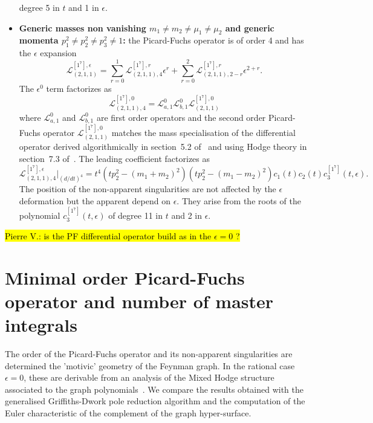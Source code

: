 \documentclass[a4paper,12pt]{article}
\numberwithin{equation}{section}
\numberwithin{figure}{subsection}
\theoremstyle{plain}
\theoremstyle{plain}
\theoremstyle{definition}
\theoremstyle{plain}
\theoremstyle{remark}
\theoremstyle{plain}
\newcommand{\pvnote}[1]{\sethlcolor{bubblegum} \protect\hl{Pierre V.: #1} \sethlcolor{yellow}}
\begin{document}
\begin{itemize}
                 degree 5 in $t$ and 1 in $\epsilon$.
  \item \textbf{Generic masses non vanishing
  $m_1\neq m_2\neq\mu_1\neq\mu_2$ and generic
  momenta  $p_1^2\neq p_2^2\neq
  p_3^2\neq 1$:}  the Picard-Fuchs operator is of order 4 and has the
  $\epsilon$ expansion
   \begin{equation}
       \mathscr{L}_{(2,1,1)}^{[1^7],\epsilon}=\sum_{r=0}^1
       \mathscr{L}_{(2,1,1),4}^{[1^7],r} \epsilon^r+ \sum_{r=0}^2
       \mathscr{L}_{(2,1,1),2-r}^{[1^7],r} \epsilon^{2+r}.
     \end{equation}
     The
     $\epsilon^0$ term factorizes as
     \begin{equation}
           \mathscr{L}_{(2,1,1),4}^{[1^7],0}=\mathscr{L}_{a,1}^0 \mathscr{L}_{b,1}^0 \mathscr{L}_{(2,1,1)}^{[1^7] ,0      }
         \end{equation}
         where $\mathscr{L}_{a,1}^0$ and  $\mathscr{L}_{b,1}^0$ are
         first order operators and  the second order
         Picard-Fuchs operator  $\mathscr{L}_{(2,1,1)}^{[1^7] ,0}
         $ matches the mass specialisation of the differential
         operator derived algorithmically in section~5.2
         of~\cite{Lairez:2022zkj} and using Hodge theory in
         section~7.3 of~\cite{DHPPV}.
         The leading coefficient factorizes as
         \begin{equation}
                     \mathscr{L}_{(2,1,1),4}^{[1^7],\epsilon}\Big|_{(d/dt)^4}=t^4
                     (tp_2^2-(m_1+m_2)^2)(tp_2^2-(m_1-m_2)^2) c_1(t)
                     c_2(t) c^{[1^7]}_3(t,\epsilon)   .
                   \end{equation}
                 The position of the non-apparent singularities are
                 not affected by the $\epsilon$ deformation but the
                 apparent depend on $\epsilon$. They arise from the
                 roots of the polynomial $c^{[1^7]}_3(t,\epsilon) $ of
                 degree 11 in $t$ and 2 in $\epsilon$.
\end{itemize}


\pvnote{is the  PF differential operator build as in the
  $\epsilon=0$ ?}

\section{Minimal order Picard-Fuchs operator and number of master integrals}

The order of the Picard-Fuchs operator and its non-apparent
singularities are determined  the 'motivic' geometry of the Feynman
graph. In the rational case $\epsilon=0$, these are derivable from an
analysis of the Mixed Hodge structure associated to the graph
polynomials~\cite{bek,Brown:2009ta,DHPPV}.
We compare the results obtained with the generalised Griffiths-Dwork
pole reduction
algorithm and the computation of the Euler characteristic of the
complement of the graph hyper-surface.
\end{document}
